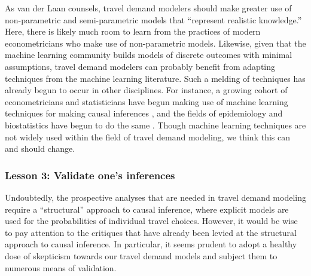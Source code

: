 As van der Laan counsels, travel demand modelers should make greater use of non-parametric and semi-parametric models that ``represent realistic knowledge.'' Here, there is likely much room to learn from the practices of modern econometricians who make use of non-parametric models. Likewise, given that the machine learning community builds models of discrete outcomes with minimal assumptions, travel demand modelers can probably benefit from adapting techniques from the machine learning literature. Such a melding of techniques has already begun to occur in other disciplines. For instance, a growing cohort of econometricians and statisticians have begun making use of machine learning techniques for making causal inferences \citep[see for example][]{hill2011bayesian, su2012facilitating, athey2016recursive}, and the fields of epidemiology and biostatistics have begun to do the same \citep[e.g.][]{cruz2006applications, van2010targeted, lee2010improving}. Though machine learning techniques are not widely used within the field of travel demand modeling, we think this can and should change.

\subsubsection{Lesson 3: Validate one's inferences}
\label{sec:validate-inferences}
Undoubtedly, the prospective analyses that are needed in travel demand modeling require a ``structural'' approach to causal inference, where explicit models are used for the probabilities of individual travel choices. However, it would be wise to pay attention to the critiques that have already been levied at the structural approach to causal inference. In particular, it seems prudent to adopt a healthy dose of skepticism towards our travel demand models and subject them to numerous means of validation.

